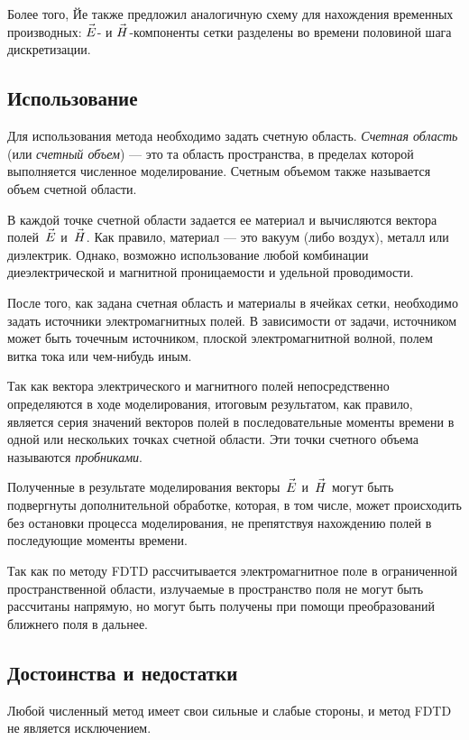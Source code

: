 Более того, Йе также предложил аналогичную схему для нахождения временных
производных: $\vec{E\mathstrut}$- и $\vec{H\mathstrut}$-компоненты сетки разделены во времени
половиной шага дискретизации.


\subsection{Использование}

Для использования метода необходимо задать счетную область.
\emph{Счетная область} (или \emph{счетный объем}) --- это та область
пространства, в пределах которой выполняется численное моделирование.
Счетным объемом также называется объем счетной области.

В каждой точке счетной области задается ее материал и вычисляются вектора
полей~$\vec{E\mathstrut}$ и~$\vec{H\mathstrut}$. Как правило, материал --- это вакуум (либо
воздух), металл или диэлектрик. Однако, возможно использование любой комбинации
диеэлектрической и магнитной проницаемости и удельной проводимости.

После того, как задана счетная область и материалы в ячейках сетки, необходимо
задать источники электромагнитных полей. В зависимости от задачи, источником
может быть точечным источником, плоской электромагнитной волной, полем витка
тока или чем-нибудь иным.

Так как вектора электрического и магнитного полей непосредственно определяются
в ходе моделирования, итоговым результатом, как правило, является серия значений
векторов полей в последовательные моменты времени в одной или нескольких точках
счетной области. Эти точки счетного объема называются \emph{пробниками}.

Полученные в результате моделирования векторы~$\vec{E\mathstrut}$ и~$\vec{H\mathstrut}$ могут быть
подвергнуты дополнительной обработке, которая, в том числе, может
происходить без остановки процесса моделирования, не препятствуя нахождению полей
в последующие моменты времени.

Так как по методу FDTD рассчитывается электромагнитное поле в ограниченной
пространственной области, излучаемые в пространство поля не могут быть рассчитаны
напрямую, но могут быть получены при помощи преобразований ближнего поля в дальнее.

\subsection{Достоинства и недостатки}

Любой численный метод имеет свои сильные и слабые стороны,
и метод FDTD не является исключением.

